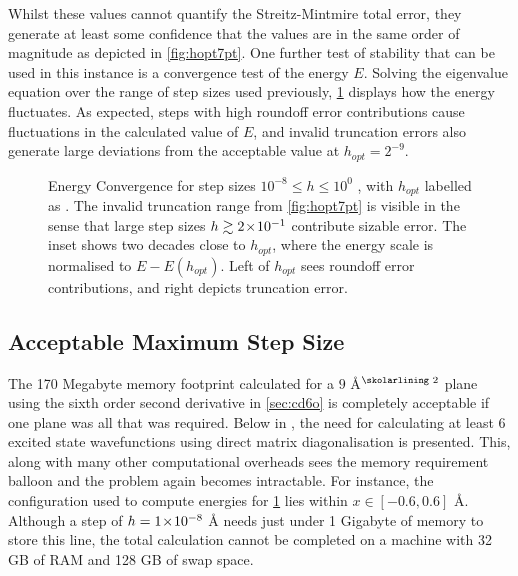 Whilst these values cannot quantify the Streitz-Mintmire total error, they generate at least some confidence that the values are in the same order of magnitude as depicted in \cref{fig:hopt7pt}.
One further test of stability that can be used in this instance is a convergence test of the energy $E$.
Solving the eigenvalue equation over the range of step sizes used previously, \cref{fig:econv} displays how the energy fluctuates.
As expected, steps with high roundoff error contributions cause fluctuations in the calculated value of $E$, and invalid truncation errors also generate large deviations from the acceptable value at $h_{opt} = 2^{-9}$.
\begin{figure}[htp]
\centering
\resizebox{0.9\textwidth}{!}{}
\caption[Energy Convergence]{\label{fig:econv}Energy Convergence for step sizes $10^{-8}\!\leq\! h\! \leq\! 10^0$ , with $h_{opt}$ labelled as . The invalid truncation range from \cref{fig:hopt7pt} is visible in the sense that large step sizes $h\gtrsim2\!\times\!10^{-1}$ contribute sizable error. The inset shows two decades close to $h_{opt}$, where the energy scale is normalised to $E-E(h_{opt})$. Left of $h_{opt}$ sees roundoff error contributions, and right depicts truncation error.}
\end{figure}

\subsection{Acceptable Maximum Step Size}

The 170 Megabyte memory footprint calculated for a $9$ Å$^\text{\skolarlining 2}$ plane using the sixth order second derivative in \cref{sec:cd6o} is completely acceptable if one plane was all that was required.
Below in , the need for calculating at least 6 excited state wavefunctions using direct matrix diagonalisation is presented.
This, along with many other computational overheads sees the memory requirement balloon and the problem again becomes intractable.
For instance, the  configuration used to compute energies for \cref{fig:econv} lies within $x \in [-0.6, 0.6]$ Å.
Although a step of $h = 1\!\times\!10^{-8}$ Å needs just under 1 Gigabyte of memory to store this line, the total calculation cannot be completed on a machine with 32 GB of RAM and 128 GB of swap space.

